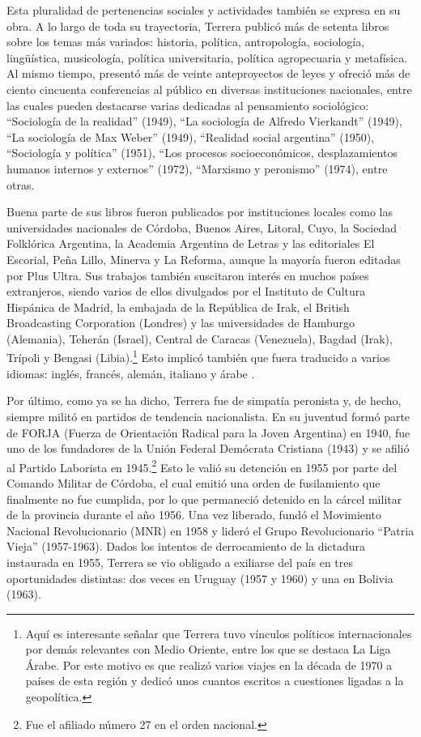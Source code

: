 Esta pluralidad de pertenencias sociales y actividades también se expresa en su obra. A lo largo de toda su trayectoria, Terrera publicó más de setenta libros sobre los temas más variados: historia, política, antropología, sociología, lingüística, musicología, política universitaria, política agropecuaria y metafísica. Al mismo tiempo, presentó más de veinte anteproyectos de leyes y ofreció más de ciento cincuenta conferencias al público en diversas instituciones nacionales, entre las cuales pueden destacarse varias dedicadas al pensamiento sociológico: \enquote{Sociología de la realidad} (1949), \enquote{La sociología de Alfredo Vierkandt} (1949), \enquote{La sociología de Max Weber} (1949), \enquote{Realidad social argentina} (1950), \enquote{Sociología y política} (1951), \enquote{Los procesos socioeconómicos, desplazamientos humanos internos y externos} (1972), \enquote{Marxismo y peronismo} (1974), entre otras.

Buena parte de sus libros fueron publicados por instituciones locales como las universidades nacionales de Córdoba, Buenos Aires, Litoral, Cuyo, la Sociedad Folklórica Argentina, la Academia Argentina de Letras y las editoriales El Escorial, Peña Lillo, Minerva y La Reforma, aunque la mayoría fueron editadas por Plus Ultra. Sus trabajos también suscitaron interés en muchos países extranjeros, siendo varios de ellos divulgados por el Instituto de Cultura Hispánica de Madrid, la embajada de la República de Irak, el British Broadcasting Corporation (Londres) y las universidades de Hamburgo (Alemania), Teherán (Israel), Central de Caracas (Venezuela), Bagdad (Irak), Trípoli y Bengasi (Libia).\footnote{Aquí es interesante señalar que Terrera tuvo vínculos políticos internacionales por demás relevantes con Medio Oriente, entre los que se destaca La Liga Árabe. Por este motivo es que realizó varios viajes en la década de 1970 a países de esta región y dedicó unos cuantos escritos a cuestiones ligadas a la geopolítica.} Esto implicó también que fuera traducido a varios idiomas: inglés, francés, alemán, italiano y árabe \parencite{1711-TERRERA1993}.

Por último, como ya se ha dicho, Terrera fue de simpatía peronista y, de hecho, siempre militó en partidos de tendencia nacionalista. En su juventud formó parte de FORJA (Fuerza de Orientación Radical para la Joven Argentina) en 1940, fue uno de los fundadores de la Unión Federal Demócrata Cristiana (1943) y se afilió al Partido Laborista en 1945.\footnote{Fue el afiliado número 27 en el orden nacional.} Esto le valió su detención en 1955 por parte del Comando Militar de Córdoba, el cual emitió una orden de fusilamiento que finalmente no fue cumplida, por lo que permaneció detenido en la cárcel militar de la provincia durante el año 1956. Una vez liberado, fundó el Movimiento Nacional Revolucionario (MNR) en 1958 y lideró el Grupo Revolucionario \enquote{Patria Vieja} (1957-1963). Dados los intentos de derrocamiento de la dictadura instaurada en 1955, Terrera se vio obligado a exiliarse del país en tres oportunidades distintas: dos veces en Uruguay (1957 y 1960) y una en Bolivia (1963).

